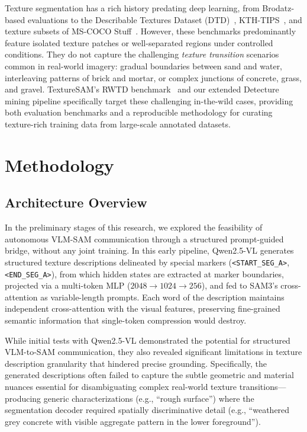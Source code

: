 \documentclass{article}
\begin{document}
Texture segmentation has a rich history predating deep learning, from Brodatz-based evaluations to the Describable Textures Dataset (DTD)~\cite{dtd}, KTH-TIPS~\cite{kth}, and texture subsets of MS-COCO Stuff~\cite{cocostuff}. However, these benchmarks predominantly feature isolated texture patches or well-separated regions under controlled conditions. They do not capture the challenging \emph{texture transition} scenarios common in real-world imagery: gradual boundaries between sand and water, interleaving patterns of brick and mortar, or complex junctions of concrete, grass, and gravel. TextureSAM's RWTD benchmark~\cite{texturesam} and our extended Detecture mining pipeline specifically target these challenging in-the-wild cases, providing both evaluation benchmarks and a reproducible methodology for curating texture-rich training data from large-scale annotated datasets.

\section{Methodology}

\subsection{Architecture Overview}
\label{sec:poc}

In the preliminary stages of this research, we explored the feasibility of autonomous VLM-SAM communication through a structured prompt-guided bridge, without any joint training. In this early pipeline, Qwen2.5-VL generates structured texture descriptions delineated by special markers (\texttt{<START\_SEG\_A>}, \texttt{<END\_SEG\_A>}), from which hidden states are extracted at marker boundaries, projected via a multi-token MLP ($2048 \to 1024 \to 256$), and fed to SAM3's cross-attention as variable-length prompts. Each word of the description maintains independent cross-attention with the visual features, preserving fine-grained semantic information that single-token compression would destroy.

While initial tests with Qwen2.5-VL demonstrated the potential for structured VLM-to-SAM communication, they also revealed significant limitations in texture description granularity that hindered precise grounding. Specifically, the generated descriptions often failed to capture the subtle geometric and material nuances essential for disambiguating complex real-world texture transitions---producing generic characterizations (e.g., ``rough surface'') where the segmentation decoder required spatially discriminative detail (e.g., ``weathered grey concrete with visible aggregate pattern in the lower foreground'').
\end{document}
